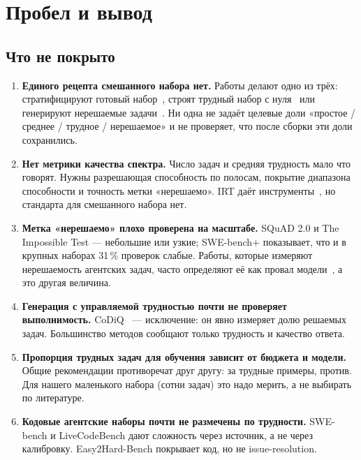 \documentclass[11pt,a4paper]{article}
\begin{document}
\section{Пробел и вывод}

\subsection{Что не покрыто}

\begin{enumerate}
  \item \textbf{Единого рецепта смешанного набора нет.} Работы делают одно из
        трёх: стратифицируют готовый набор~\cite{easy2hard2024,taco2023},
        строят трудный набор с нуля~\cite{gpqa2023,hle2025,frontiermath2024}
        или генерируют нерешаемые задачи~\cite{squad2_2018,impossible_test2024,impossiblebench2025}.
        Ни одна не задаёт целевые доли «простое / среднее / трудное /
        нерешаемое» и не проверяет, что после сборки эти доли сохранились.
  \item \textbf{Нет метрики качества спектра.} Число задач и средняя
        трудность мало что говорят. Нужны разрешающая способность по
        полосам, покрытие диапазона способности и точность метки
        «нерешаемо». IRT даёт инструменты~\cite{atlas2025,tinybenchmarks2024},
        но стандарта для смешанного набора нет.
  \item \textbf{Метка «нерешаемо» плохо проверена на масштабе.} SQuAD
        2.0 и The Impossible Test — небольшие или узкие; SWE-bench+
        показывает, что и в крупных наборах 31\,\% проверок слабые. Работы,
        которые измеряют нерешаемость агентских задач, часто определяют её
        как провал модели~\cite{unlocking_unsolvable2026}, а это другая
        величина.
  \item \textbf{Генерация с управляемой трудностью почти не проверяет
        выполнимость.} CoDiQ~\cite{codiq2026} — исключение: он явно
        измеряет долю решаемых задач. Большинство методов сообщают только
        трудность и качество ответа.
  \item \textbf{Пропорция трудных задач для обучения зависит от бюджета и
        модели.} Общие рекомендации противоречат друг другу:
        \cite{difficulty_tradeoff2026,selective_dpo2025} за трудные примеры,
        \cite{coverage2026} против. Для нашего маленького набора (сотни
        задач) это надо мерить, а не выбирать по литературе.
  \item \textbf{Кодовые агентские наборы почти не размечены по трудности.}
        SWE-bench и LiveCodeBench дают сложность через источник, а не через
        калибровку. Easy2Hard-Bench покрывает код, но не issue-resolution.
\end{enumerate}
\end{document}
